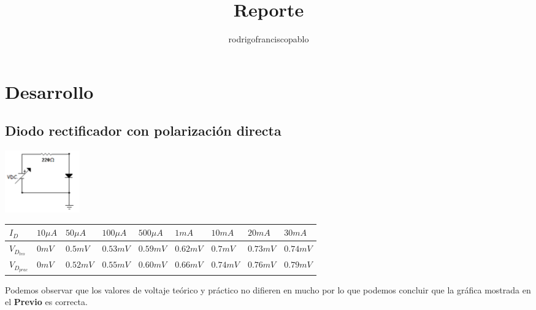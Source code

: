 \documentclass{mylib/reporteConCalif}
\title{Reporte}
\author{rodrigofranciscopablo }
\begin{document}
\coverPage


\section*{Desarrollo}

\subsection*{Diodo rectificador con polarización directa}
\begin{center}
	\includegraphics[scale=1]{img/labdisp_pract3/diodorec_d}


	\begin{tabu} to 0.8\textwidth { | X[c] | X[c] | X[c] | X[c] | X[c] | X[c] | X[c] | X[c] | X[c] | }
	 \hline
	 $I_{D}$ & $10 \mu A$ & $50 \mu A$ & $100 \mu A$ & $500 \mu A$ & $1 mA$ & $10 mA$ & $20 mA$ & $30 mA$\\
	 \hline
	 $V_{D_{teo}}$ & $0 mV$ & $0.5 mV$ & $0.53 mV$ & $0.59 mV$ & $0.62 mV$ & $0.7 mV$ & $0.73 mV$ & $0.74 mV$\\
	\hline
	$V_{D_{prac}}$ & $0 mV$ & $0.52 mV$ & $0.55 mV$ & $0.60 mV$ & $0.66 mV$ & $0.74 mV$ & $0.76 mV$ & $0.79 mV$\\
	\hline
	\end{tabu}

\end{center}

Podemos observar que los valores de voltaje teórico y práctico no difieren en mucho por lo que podemos concluir que la gráfica mostrada en el \textbf{Previo} es correcta.
\end{document}
